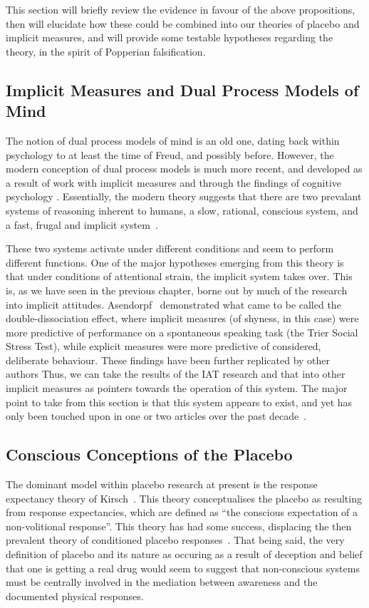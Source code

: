 This section will briefly review the evidence in favour of the above propositions, then will elucidate how these could be combined into our theories of placebo and implicit measures, and will provide some testable hypotheses regarding the theory, in the spirit of Popperian falsification.

\subsection{Implicit Measures and Dual Process Models of Mind}

The notion of dual process models of mind is an old one, dating back within psychology to at least the time of Freud, and possibly before. However, the modern conception of dual process models is much more recent, and developed as a result of work with implicit measures and through the findings of cognitive psychology \cite{Kahneman2002,Greenwald1995a,Gigerenzer2011,Klauer2007}. Essentially, the modern theory suggests that there are two prevalant systems of reasoning inherent to humans, a slow, rational, conscious system, and a fast, frugal and implicit system~\cite{Kahneman2002}. 

These two systems activate under different conditions and seem to perform different functions. One of the major hypotheses emerging from this theory is that under conditions of attentional strain, the implicit system takes over. This is, as we have seen in the previous chapter, borne out by much of the research into implicit attitudes. Asendorpf~\cite{Asendorpf2002} demonstrated what came to be called the double-dissociation effect, where implicit measures (of shyness, in this case) were more predictive of performance on a spontaneous speaking task (the Trier Social Stress Test), while explicit measures were more predictive of considered, deliberate behaviour. These findings have been further replicated by other authors   Thus, we can take the results of the IAT research and that into other implicit measures as pointers towards the operation of this system. The major point to take from this section is that this system appears to exist, and yet has only been touched upon in one or two articles over the past decade~\cite{Geers2005}. 

\subsection{Conscious Conceptions of the Placebo}

The dominant model within placebo research at present is the response expectancy theory of Kirsch~\cite{Kirsch1985, Kirsch1997a}. This theory conceptualises the placebo as resulting from response expectancies, which are defined as ``the conscious expectation of a non-volitional response''. This theory has had some success, displacing the then prevalent theory of conditioned placebo responses~\cite{Vuodouris1985}. That being said, the very definition of placebo and its nature as occuring as a result of deception and belief that one is getting a real drug would seem to suggest that non-conscious systems must be centrally involved in the mediation between awareness and the documented physical responses. 

